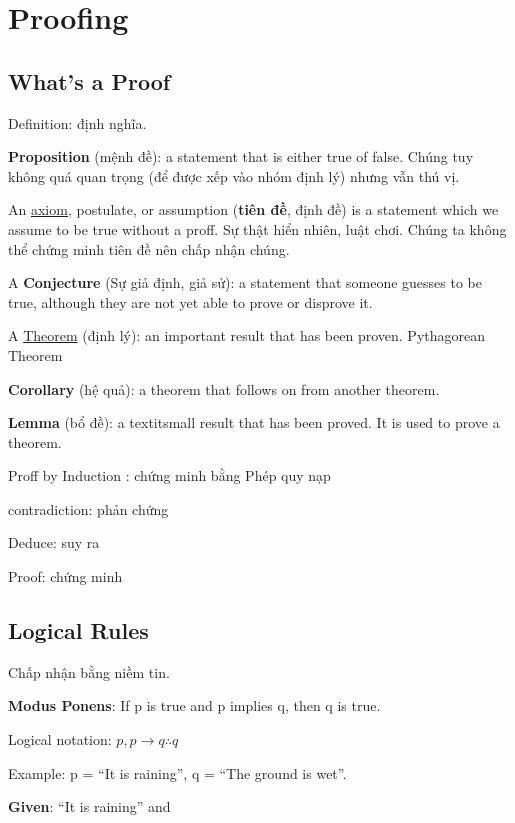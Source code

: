 \chapter{Proofing}

\section{What's a Proof}

Definition: định nghĩa.

\textbf{Proposition} (mệnh đề): a statement that is either true of false. Chúng tuy không quá quan trọng (để được xếp vào nhóm định lý) nhưng vẫn thú vị.

An \href{https://en.wikipedia.org/wiki/Axiom}{axiom}, postulate, or assumption (\textbf{tiên đề}, định đề) is a statement which we assume to be true without a proff. Sự thật hiển nhiên, luật chơi. Chúng ta không thể chứng minh tiên đề nên chấp nhận chúng.

A \textbf{Conjecture} (Sự giả định, giả sử): a statement that someone guesses to be true, although they are not yet able to prove or disprove it.

A \href{https://en.wikipedia.org/wiki/Theorem}{Theorem} (định lý): an important result that has been proven. Pythagorean Theorem

\textbf{Corollary} (hệ quả): a theorem that follows on from another theorem.

\textbf{Lemma} (bổ đề): a textit{small} result that has been proved. It is used to prove a theorem.

Proff by Induction : chứng minh bằng Phép quy nạp

contradiction: phản chứng

Deduce: suy ra

Proof: chứng minh

\section{Logical Rules}

Chấp nhận bằng niềm tin.

\noindent \textbf{Modus Ponens}: If p is true and p implies q, then q is true.

Logical notation: \(p,p \rightarrow q \therefore q\)

Example: p = ``It is raining'', q = ``The ground is wet''.

\textbf{Given}: ``It is raining'' and 

